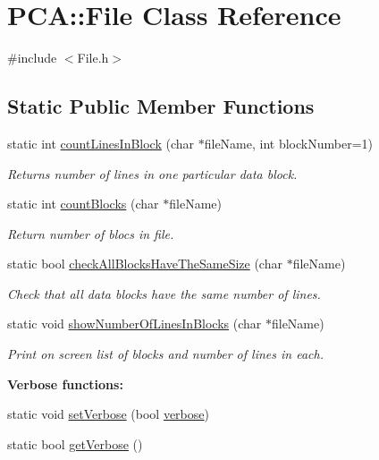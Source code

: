 \hypertarget{class_p_c_a_1_1_file}{}\section{P\+CA\+:\+:File Class Reference}
\label{class_p_c_a_1_1_file}


{\ttfamily \#include $<$File.\+h$>$}

\subsection*{Static Public Member Functions}
\begin{DoxyCompactItemize}
\item 
static int \hyperlink{class_p_c_a_1_1_file_a832795e34ab12c9fd127bdf99d89efa3}{count\+Lines\+In\+Block} (char $\ast$file\+Name, int block\+Number=1)
\begin{DoxyCompactList}\small\item\em Returns number of lines in one particular data block. \end{DoxyCompactList}\item 
static int \hyperlink{class_p_c_a_1_1_file_a25bcd550fcc9e0a948f4c553b330a7a6}{count\+Blocks} (char $\ast$file\+Name)
\begin{DoxyCompactList}\small\item\em Return number of blocs in file. \end{DoxyCompactList}\item 
static bool \hyperlink{class_p_c_a_1_1_file_aee5a821758a1c8f582a3ffc4be046e8d}{check\+All\+Blocks\+Have\+The\+Same\+Size} (char $\ast$file\+Name)
\begin{DoxyCompactList}\small\item\em Check that all data blocks have the same number of lines. \end{DoxyCompactList}\item 
static void \hyperlink{class_p_c_a_1_1_file_a25dd7a0266edd1fc026f27448003b36f}{show\+Number\+Of\+Lines\+In\+Blocks} (char $\ast$file\+Name)
\begin{DoxyCompactList}\small\item\em Print on screen list of blocks and number of lines in each. \end{DoxyCompactList}\end{DoxyCompactItemize}
\begin{Indent}{\bf Verbose functions\+:}\par
\begin{DoxyCompactItemize}
\item 
static void \hyperlink{class_p_c_a_1_1_file_a71cb80c09faa4be71eb09ae074aac4b2}{set\+Verbose} (bool \hyperlink{class_p_c_a_1_1_file_a7d78765563f9be7e1ca260dcd3c65053}{verbose})
\item 
static bool \hyperlink{class_p_c_a_1_1_file_aa080868b37deb641c3369c397f84fd1b}{get\+Verbose} ()
\end{DoxyCompactItemize}
\end{Indent}
